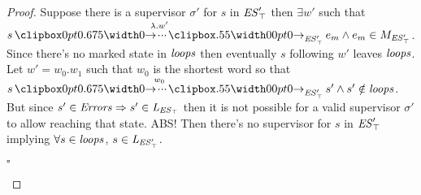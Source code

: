\begin{proof}
Suppose there is a supervisor $\sigma'$ for $s$ in $\mathit{\mathit{ES}'_{\top}}$ then $\exists w'$ such that $s \runw{\lambda.w'}{\unexploredToTop{\structure'}} e_m \wedge e_m \in M_{\unexploredToTop{\structure'}}$. Since there's no marked state in $\mathit{loops}$ then eventually $s$ following $w'$ leaves $\mathit{loops}$. \\
Let $w' = w_0.w_1$ such that $w_0$ is the shortest word so that $s \runw{w_0}{\unexploredToTop{\structure'}} s' \wedge s' \notin \SCC$. But since $s'\in \mathit{Errors} \Rightarrow s' \in \mathit{L_{\mathit{\mathit{ES}_{\top}}}}$ then it is not possible for a valid supervisor $\sigma'$ to allow reaching that state. ABS! Then there's no supervisor for $s$ in $\mathit{\mathit{ES}'_{\top}}$ implying $\forall s \in \mathit{loops}$, $s \in \mathit{L_{\mathit{\mathit{ES}'_{\top}}}}$.
\begin{flushright}
	$\square$
\end{flushright}
\end{proof}